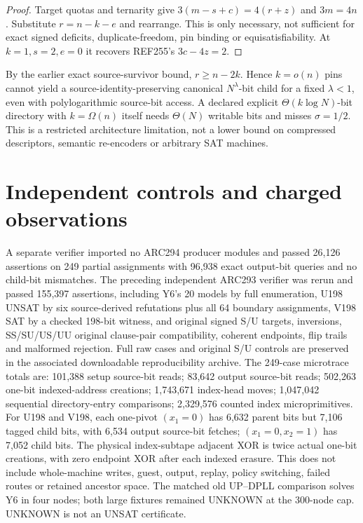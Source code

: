 \documentclass[10pt]{article}
\begin{document}
\begin{proof}Target quotas and ternarity give $3(m-s+c)=4(r+z)$ and $3m=4n$. Substitute $r=n-k-e$ and rearrange. This is only necessary, not sufficient for exact signed deficits, duplicate-freedom, pin binding or equisatisfiability. At $k=1,s=2,e=0$ it recovers REF255's $3c-4z=2$.\end{proof}
By the earlier exact source-survivor bound, $r\ge n-2k$. Hence $k=o(n)$ pins cannot yield a source-identity-preserving canonical $N^\lambda$-bit child for a fixed $\lambda<1$, even with polylogarithmic source-bit access. A declared explicit $\Theta(k\log N)$-bit directory with $k=\Omega(n)$ itself needs $\Theta(N)$ writable bits and misses $\sigma=1/2$. This is a restricted architecture limitation, not a lower bound on compressed descriptors, semantic re-encoders or arbitrary SAT machines.

\section{Independent controls and charged observations}
A separate verifier imported no ARC294 producer modules and passed 26,126 assertions on 249 partial assignments with 96,938 exact output-bit queries and no child-bit mismatches. The preceding independent ARC293 verifier was rerun and passed 155,397 assertions, including Y6's 20 models by full enumeration, U198 UNSAT by six source-derived refutations plus all 64 boundary assignments, V198 SAT by a checked 198-bit witness, and original signed S/U targets, inversions, SS/SU/US/UU original clause-pair compatibility, coherent endpoints, flip trails and malformed rejection. Full raw cases and original S/U controls are preserved in the associated downloadable reproducibility archive.
The 249-case microtrace totals are: 101,388 setup source-bit reads; 83,642 output source-bit reads; 502,263 one-bit indexed-address creations; 1,743,671 index-head moves; 1,047,042 sequential directory-entry comparisons; 2,329,576 counted index microprimitives. For U198 and V198, each one-pivot $(x_1=0)$ has 6,632 parent bits but 7,106 tagged child bits, with 6,534 output source-bit fetches; $(x_1=0,x_2=1)$ has 7,052 child bits. The physical index-subtape adjacent XOR is twice actual one-bit creations, with zero endpoint XOR after each indexed erasure. This does not include whole-machine writes, guest, output, replay, policy switching, failed routes or retained ancestor space. The matched old UP--DPLL comparison solves Y6 in four nodes; both large fixtures remained UNKNOWN at the 300-node cap. UNKNOWN is not an UNSAT certificate.
\end{document}
